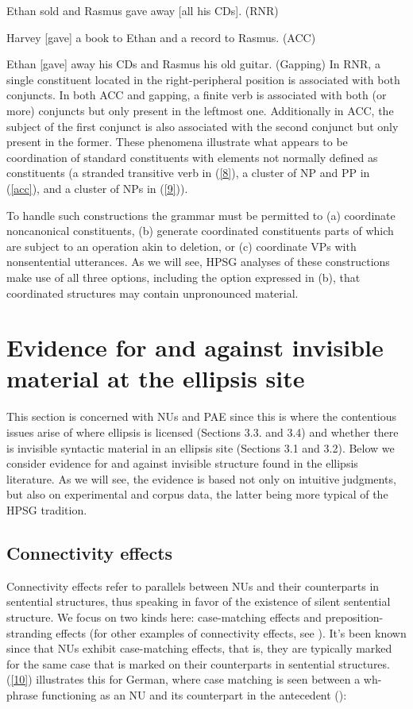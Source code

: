 \documentclass[output=paper
	        ,collection
	        ,collectionchapter
 	        ,biblatex
                ,babelshorthands
                ,newtxmath
                ,draftmode
                ,colorlinks, citecolor=brown
]{langscibook}
\begin{document}
{ \ea Ethan sold and Rasmus gave away [all his CDs]. (RNR) \label{8}\z

\ea Harvey [gave] a book to Ethan and a record to Rasmus. (ACC) \label{acc}\z

 \ea Ethan [gave] away his CDs and Rasmus his old guitar. (Gapping)\label{9}\z
In RNR, a single constituent located in the right-peripheral position is associated with both conjuncts. In both ACC and gapping, a finite verb is associated with both (or more) conjuncts but only present in the leftmost one. Additionally in ACC, the subject of the first conjunct is also associated with the second conjunct but only present in the former. These phenomena illustrate what appears to be coordination of standard constituents with elements not normally defined as constituents (a stranded transitive verb in (\ref{8}), a cluster of NP and PP in (\ref{acc}), and a cluster of NPs in (\ref{9})).
%

 To handle such constructions the grammar must be permitted to (a) coordinate noncanonical constituents, (b) generate coordinated constituents parts of which are subject to an operation akin to deletion, or (c) coordinate VPs with nonsentential utterances. As we will see, HPSG analyses of these constructions make use of all three options, including the option expressed in (b), that coordinated structures may contain unpronounced material.

\section{Evidence for and against invisible material at the ellipsis site}
\label{sec-evidence-for-invisible-material}

This section is concerned with NUs and PAE since this is where the contentious issues arise of where ellipsis is licensed (Sections 3.3. and 3.4) and whether there is invisible syntactic material in an ellipsis site (Sections 3.1 and 3.2). Below we consider evidence for and against invisible structure found in the ellipsis literature. As we will see, the evidence is based not only on intuitive judgments, but also on experimental and corpus data, the latter being more typical of the HPSG tradition.


\subsection{Connectivity effects}
\label{sec-connectivity-effects}

Connectivity effects refer to parallels between NUs and their counterparts in sentential structures, thus speaking in favor of the existence of silent sentential structure. We focus on two kinds here: case-matching effects and preposition-stranding effects (for other examples of connectivity effects, see \citealt{Ginzburg2018}). It's been known since \citet{Ross1967} that NUs exhibit case-matching effects, that is, they are typically marked for the same case that is marked on their counterparts in sentential structures. (\ref{10}) illustrates this for German, where case matching is seen between a wh-phrase functioning as an NU and its counterpart in the antecedent (\citealt[663]{Merchant2005}):

}
\end{document}
